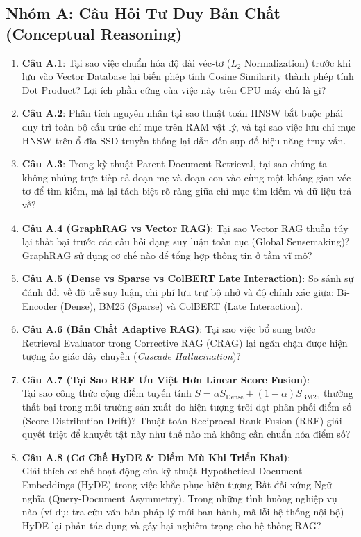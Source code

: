 \subsection{Nhóm A: Câu Hỏi Tư Duy Bản Chất (Conceptual Reasoning)}
\begin{enumerate}
  \item \textbf{Câu A.1}: Tại sao việc chuẩn hóa độ dài véc-tơ ($L_2$ Normalization) trước khi lưu vào Vector Database lại biến phép tính Cosine Similarity thành phép tính Dot Product? Lợi ích phần cứng của việc này trên CPU máy chủ là gì?
  \item \textbf{Câu A.2}: Phân tích nguyên nhân tại sao thuật toán HNSW bắt buộc phải duy trì toàn bộ cấu trúc chỉ mục trên RAM vật lý, và tại sao việc lưu chỉ mục HNSW trên ổ đĩa SSD truyền thống lại dẫn đến sụp đổ hiệu năng truy vấn.
  \item \textbf{Câu A.3}: Trong kỹ thuật Parent-Document Retrieval, tại sao chúng ta không nhúng trực tiếp cả đoạn mẹ và đoạn con vào cùng một không gian véc-tơ để tìm kiếm, mà lại tách biệt rõ ràng giữa chỉ mục tìm kiếm và dữ liệu trả về?
  \item \textbf{Câu A.4 (GraphRAG vs Vector RAG)}: Tại sao Vector RAG thuần túy lại thất bại trước các câu hỏi dạng suy luận toàn cục (Global Sensemaking)? GraphRAG sử dụng cơ chế nào để tổng hợp thông tin ở tầm vĩ mô?
  \item \textbf{Câu A.5 (Dense vs Sparse vs ColBERT Late Interaction)}: So sánh sự đánh đổi về độ trễ suy luận, chi phí lưu trữ bộ nhớ và độ chính xác giữa: Bi-Encoder (Dense), BM25 (Sparse) và ColBERT (Late Interaction).
  \item \textbf{Câu A.6 (Bản Chất Adaptive RAG)}: Tại sao việc bổ sung bước Retrieval Evaluator trong Corrective RAG (CRAG) lại ngăn chặn được hiện tượng ảo giác dây chuyền (\textit{Cascade Hallucination})?
  \item \textbf{Câu A.7 (Tại Sao RRF Ưu Việt Hơn Linear Score Fusion)}: \\
  Tại sao công thức cộng điểm tuyến tính $S = \alpha S_{\text{Dense}} + (1-\alpha) S_{\text{BM25}}$ thường thất bại trong môi trường sản xuất do hiện tượng trôi dạt phân phối điểm số (Score Distribution Drift)? Thuật toán Reciprocal Rank Fusion (RRF) giải quyết triệt để khuyết tật này như thế nào mà không cần chuẩn hóa điểm số?
  \item \textbf{Câu A.8 (Cơ Chế HyDE \& Điểm Mù Khi Triển Khai)}: \\
  Giải thích cơ chế hoạt động của kỹ thuật Hypothetical Document Embeddings (HyDE) trong việc khắc phục hiện tượng Bất đối xứng Ngữ nghĩa (Query-Document Asymmetry). Trong những tình huống nghiệp vụ nào (ví dụ: tra cứu văn bản pháp lý mới ban hành, mã lỗi hệ thống nội bộ) HyDE lại phản tác dụng và gây hại nghiêm trọng cho hệ thống RAG?
\end{enumerate}

